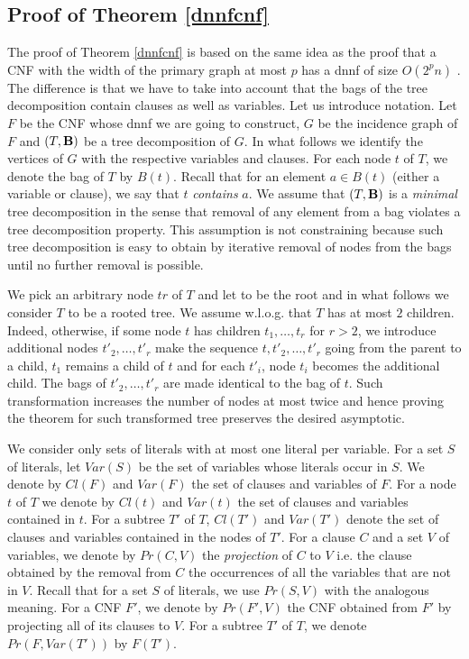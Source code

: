 \documentclass{llncs}
\begin{document}
\subsection{Proof of Theorem \ref{dnnfcnf}} \label{dnnfcnfproof}

The proof of Theorem \ref{dnnfcnf} is based on the same idea as the proof that a CNF with the width of the primary graph
at most $p$ has a {\sc dnnf} of size $O(2^pn)$ \cite{DarwicheJACM}. The difference is that we have to take into account that
the bags of the tree decomposition contain clauses as well as variables. Let us introduce notation. Let $F$ be the CNF whose
{\sc dnnf} we are going to construct,
$G$ be the incidence graph of $F$ and $(T,{\bf B})$ be a tree decomposition of $G$. In what follows we identify the vertices
of $G$ with the respective variables and clauses. For each node $t$ of $T$, we denote the bag of $T$ by $B(t)$. 
Recall that for an element $a \in B(t)$ (either a variable or clause), we say 
that $t$ \emph{contains} $a$. 
We assume that $(T,{\bf B})$ is a \emph{minimal} tree decomposition in the sense that removal of
any element from a bag violates a tree decomposition property. This assumption is not constraining
because such tree decomposition is easy to obtain by iterative removal of nodes from the bags until no
further removal is possible.  


We pick an arbitrary node $tr$ of $T$ and let to be the root and in what follows
we consider $T$ to be a rooted tree. We assume w.l.o.g. that $T$ has at most $2$ children. 
Indeed, otherwise, if some node $t$ has
children $t_1, \dots, t_r$ for $r>2$, we introduce additional nodes $t'_2, \dots, t'_r$ make the sequence $t,t'_2, \dots, t'_r$ going from the parent to a child, $t_1$ remains a child of $t$ and for each $t'_i$, node $t_i$ becomes the additional child.
The bags of $t'_2, \dots, t'_r$ are made identical to the bag of $t$. Such transformation increases the number of nodes at most twice and hence proving the theorem for such transformed tree preserves the desired asymptotic. 

We consider only sets of literals with at most one literal per variable. For a set $S$ of literals, let $Var(S)$
be the set of variables whose literals occur in $S$.
We denote by $Cl(F)$ and $Var(F)$ the set of clauses and variables of $F$. For a node $t$ of $T$ we denote by $Cl(t)$
and $Var(t)$ the set of clauses and variables contained in $t$. For a subtree $T'$ of $T$, $Cl(T')$ and $Var(T')$ denote
the set of clauses and variables contained in the nodes of $T'$. For a clause $C$ and a set $V$ of variables, we denote
by $Pr(C,V)$ the \emph{projection} of $C$ to $V$ i.e. the clause obtained by the removal from $C$ the occurrences
of all the variables that are not in $V$. Recall that for a set $S$ of literals, we use $Pr(S,V)$ with the analogous meaning. 
For a CNF $F'$, we denote by $Pr(F',V)$ the CNF obtained from $F'$ by
projecting all of its clauses to $V$. 
For a subtree $T'$ of $T$, we denote $Pr(F,Var(T'))$ by $F(T')$.
\end{document}
